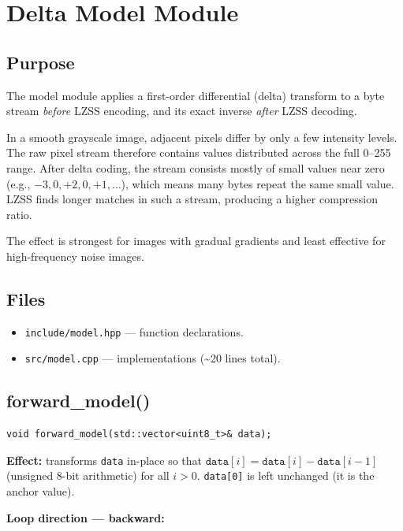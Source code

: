 \section{Delta Model Module}

\subsection{Purpose}

The model module applies a first-order differential (delta) transform to a byte stream
\emph{before} LZSS encoding, and its exact inverse \emph{after} LZSS decoding.

In a smooth grayscale image, adjacent pixels differ by only a few intensity levels.
The raw pixel stream therefore contains values distributed across the full 0--255 range.
After delta coding, the stream consists mostly of small values near zero
(e.g., $-3, 0, +2, 0, +1, \ldots$), which means many bytes repeat the same small value.
LZSS finds longer matches in such a stream, producing a higher compression ratio.

The effect is strongest for images with gradual gradients and least effective for
high-frequency noise images.

\subsection{Files}

\begin{itemize}
  \item \texttt{include/model.hpp} --- function declarations.
  \item \texttt{src/model.cpp} --- implementations (\textasciitilde{}20 lines total).
\end{itemize}

\subsection{forward\_model()}

\begin{lstlisting}[style=cpp]
void forward_model(std::vector<uint8_t>& data);
\end{lstlisting}

\textbf{Effect:} transforms \texttt{data} in-place so that
$\mathtt{data}[i] = \mathtt{data}[i] - \mathtt{data}[i-1]$ (unsigned 8-bit arithmetic)
for all $i > 0$.
\texttt{data[0]} is left unchanged (it is the anchor value).

\textbf{Loop direction --- backward:}

